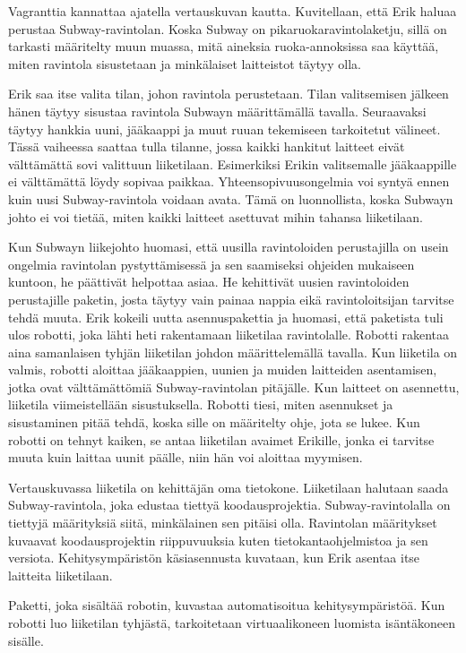 Vagranttia kannattaa ajatella vertauskuvan kautta. Kuvitellaan, että Erik haluaa perustaa Subway-ravintolan. Koska Subway on pikaruokaravintolaketju, sillä on tarkasti määritelty muun muassa, mitä aineksia ruoka-annoksissa saa käyttää, miten ravintola sisustetaan ja minkälaiset laitteistot täytyy olla.

Erik saa itse valita tilan, johon ravintola perustetaan. Tilan valitsemisen jälkeen hänen täytyy sisustaa ravintola Subwayn määrittämällä tavalla. Seuraavaksi täytyy hankkia uuni, jääkaappi ja muut ruuan tekemiseen tarkoitetut välineet. Tässä vaiheessa saattaa tulla tilanne, jossa kaikki hankitut laitteet eivät välttämättä sovi valittuun liiketilaan. Esimerkiksi Erikin valitsemalle jääkaappille ei välttämättä löydy sopivaa paikkaa. Yhteensopivuusongelmia voi syntyä ennen kuin uusi Subway-ravintola voidaan avata. Tämä on luonnollista, koska Subwayn johto ei voi tietää, miten kaikki laitteet asettuvat mihin tahansa liiketilaan.

Kun Subwayn liikejohto huomasi, että uusilla ravintoloiden perustajilla on usein ongelmia ravintolan pystyttämisessä ja sen saamiseksi ohjeiden mukaiseen kuntoon, he päättivät helpottaa asiaa. He kehittivät uusien ravintoloiden perustajille paketin, josta täytyy vain painaa nappia eikä ravintoloitsijan tarvitse tehdä muuta. Erik kokeili uutta asennuspakettia ja huomasi, että paketista tuli ulos robotti, joka lähti heti rakentamaan liiketilaa ravintolalle. Robotti rakentaa aina samanlaisen tyhjän liiketilan johdon määrittelemällä tavalla. Kun liiketila on valmis, robotti aloittaa jääkaappien, uunien ja muiden laitteiden asentamisen, jotka ovat välttämättömiä Subway-ravintolan pitäjälle. Kun laitteet on asennettu, liiketila viimeistellään sisustuksella. Robotti tiesi, miten asennukset ja sisustaminen pitää tehdä, koska sille on määritelty ohje, jota se lukee. Kun robotti on tehnyt kaiken, se antaa liiketilan avaimet Erikille, jonka ei tarvitse muuta kuin laittaa uunit päälle, niin hän voi aloittaa myymisen.

Vertauskuvassa liiketila on kehittäjän oma tietokone. Liiketilaan halutaan saada Subway-ravintola, joka edustaa tiettyä koodausprojektia. Subway-ravintolalla on tiettyjä määrityksiä siitä, minkälainen sen pitäisi olla. Ravintolan määritykset kuvaavat koodausprojektin riippuvuuksia kuten tietokantaohjelmistoa ja sen versiota. Kehitysympäristön käsiasennusta kuvataan, kun Erik asentaa itse laitteita liiketilaan.

Paketti, joka sisältää robotin, kuvastaa automatisoitua kehitysympäristöä. Kun robotti luo liiketilan tyhjästä, tarkoitetaan virtuaalikoneen luomista isäntäkoneen sisälle.

